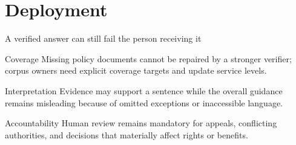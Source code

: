 \section{Deployment}

\begin{frame}{A verified answer can still fail the person receiving it}
  \begin{block}{Coverage}
    Missing policy documents cannot be repaired by a stronger verifier; corpus owners need explicit coverage targets and update service levels.
  \end{block}
  \begin{alertblock}{Interpretation}
    Evidence may support a sentence while the overall guidance remains misleading because of omitted exceptions or inaccessible language.
  \end{alertblock}
  \begin{exampleblock}{Accountability}
    Human review remains mandatory for appeals, conflicting authorities, and decisions that materially affect rights or benefits.
  \end{exampleblock}
\end{frame}

